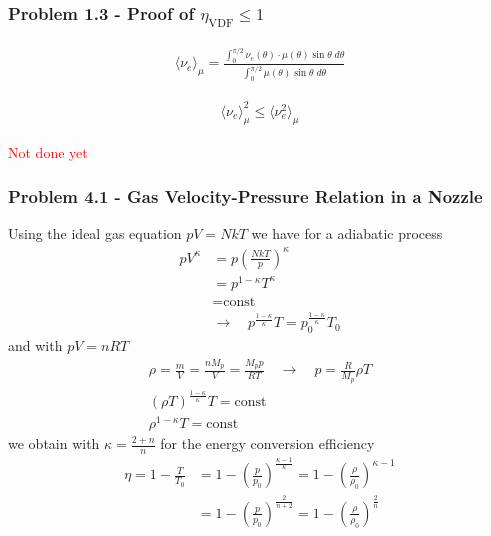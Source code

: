 \documentclass[10pt,a4paper]{article}
\theoremstyle{definition}
\begin{document}
\subsubsection{Problem 1.3 - Proof of \texorpdfstring{$\eta_\text{VDF}\le1$}{Lg} }
\begin{align}
    \langle \nu_e\rangle_\mu=\frac{\int_0^{\pi/2}\nu_e(\theta)\cdot\mu(\theta)\sin\theta\;d\theta}{\int_0^{\pi/2}\mu(\theta)\sin\theta\;d\theta}
\end{align}

\begin{align}
    \langle \nu_e\rangle_\mu^2\le\langle \nu_e^2\rangle_\mu    
\end{align}

\textcolor{red}{Not done yet}

\subsubsection{Problem 4.1 - Gas Velocity-Pressure Relation in a Nozzle}
Using the ideal gas equation $pV=NkT$ we have for a adiabatic process
\begin{align}
    pV^\kappa&=p\left(\frac{NkT}{p}\right)^\kappa\\
    &=p^{1-\kappa}T^\kappa\\
    &=\text{const}\\
    &\rightarrow\quad p^\frac{1-\kappa}{\kappa}T=p_0^\frac{1-\kappa}{\kappa}T_0
\end{align}
and with $pV=nRT$
\begin{align}
    \rho=\frac{m}{V}=\frac{nM_p}{V}=\frac{M_pp}{RT}\quad\rightarrow\quad p=\frac{R}{M_p}\rho T\\
    (\rho T)^\frac{1-\kappa}{\kappa}T=\text{const}\\
    \rho^{1-\kappa}T=\text{const}
\end{align}
we obtain with $\kappa=\frac{2+n}{n}$ for the energy conversion efficiency 
\begin{align}
    \eta=1-\frac{T}{T_0}&=1-\left(\frac{p}{p_0}\right)^\frac{\kappa-1}{\kappa}=1-\left(\frac{\rho}{\rho_0}\right)^{\kappa-1}\\
    &=1-\left(\frac{p}{p_0}\right)^\frac{2}{n+2}=1-\left(\frac{\rho}{\rho_0}\right)^\frac{2}{n}\\
\end{align}

\newpage
\end{document}
